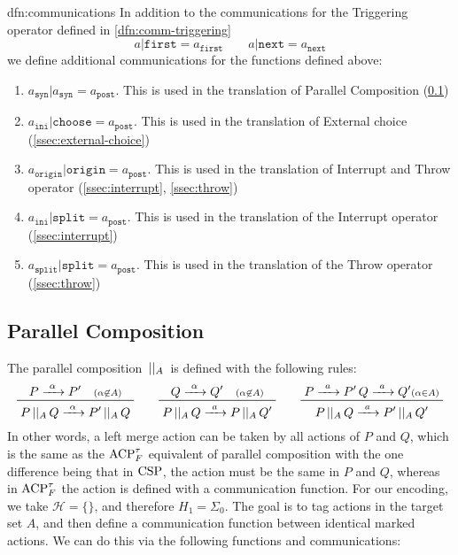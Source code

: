 \documentclass[../hons_project.tex]{subfiles}
\begin{document}
\newpage
\begin{dfn}[Communications]{dfn:communications}{}
	In addition to the communications for the Triggering operator defined in \ref{dfn:comm-triggering}
	\vspace{-5pt}
	\[a | \mathtt{first} = a_{\mathtt{first}} \qquad a | \mathtt{next} = a_{\mathtt{next}} \]
	\vspace{-5pt}
	we define additional communications for the functions defined above:

	\begin{enumerate}[leftmargin=*]
		\item $a_{\mathtt{syn}} | a_{\mathtt{syn}} = a_{\mathtt{post}}$. This is used in the translation of Parallel Composition (\ref{ssec:parallel-composition})
		\item $a_{\mathtt{ini}} | \mathtt{choose} = a_{\mathtt{post}}$. This is used in the translation of External choice (\ref{ssec:external-choice})
		\item $a_{\mathtt{origin}} | \mathtt{origin} = a_{\mathtt{post}}$. This is used in the translation of Interrupt and Throw operator (\ref{ssec:interrupt}, \ref{ssec:throw})
		\item $a_{\mathtt{ini}} | \mathtt{split} = a_{\mathtt{post}}$. This is used in the translation of the Interrupt operator (\ref{ssec:interrupt})
		\item $a_{\mathtt{split}} | \mathtt{split} = a_{\mathtt{post}}$. This is used in the translation of the Throw operator (\ref{ssec:throw})
	\end{enumerate}
\end{dfn}



\subsection{Parallel Composition}\label{ssec:parallel-composition}
The parallel composition $\,\vert\vert_{A}\,$ is defined with the following rules:
\begin{equation}\label{eq:pcomp-definition}
	\prftree{P \prightarrow{\alpha} P' \quad \scriptstyle(\alpha\not\in A)}{P \pcomp Q \prightarrow{\alpha} P'\pcomp Q} \qquad \prftree{Q \prightarrow{\alpha} Q' \quad \scriptstyle(\alpha\not\in A) }{P \pcomp Q \prightarrow{a} P\pcomp Q'}\qquad \prftree{P \prightarrow{a} P' \, Q \prightarrow{a} Q'\scriptstyle(\alpha\in A)}{P \pcomp Q \prightarrow{a} P' \pcomp Q'}
\end{equation}
In other words, a left merge action can be taken by all actions of $P$ and $Q$, which is the same as the $\mathrm{ACP}_{F}^{\tau}$ equivalent of parallel composition with the one difference being that in $\mathrm{CSP}$, the action must be the same in $P$ and $Q$, whereas in $\mathrm{ACP}_{F}^{\tau}$ the action is defined with a communication function. For our encoding, we take $\mathscr{H} = \{\}$, and therefore $H_{1} = \Sigma_{0}$. The goal is to tag actions in the target set $A$, and then define a communication function between identical marked actions. We can do this via the following functions and communications:
\end{document}
